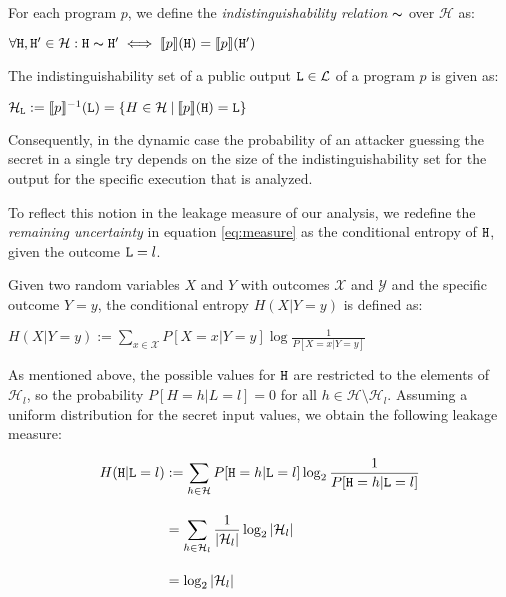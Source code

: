 \begin{definition}\label{def:ir}
        For each program $p$, we define the \emph{indistinguishability relation} $\thicksim$ over $\mathcal{H}$ as:
        \begin{center}
            $\forall \mathtt{H}, \mathtt{H}' \in \mathcal{H}: \mathtt{H} \thicksim  \mathtt{H}' \iff \llbracket p \rrbracket(\mathtt{H}) = \llbracket p \rrbracket(\mathtt{H}')$
        \end{center}
\end{definition}

\begin{definition}\label{def:is}
    The indistinguishability set of a public output $\mathtt{L} \in \mathcal{L}$ of a program $p$ is given as:
    \begin{center}
        $\mathcal{H}_{\mathtt{L}} := \llbracket p \rrbracket^{-1} (\mathtt{L}) = \{ H \in \mathcal{H} \: | \: \llbracket p \rrbracket (\mathtt{H}) = \mathtt{L} \}$
    \end{center}
\end{definition}

Consequently, in the dynamic case the probability of an attacker guessing the secret in a single try depends on the size of the indistinguishability set for the output for the specific execution that is analyzed.

To reflect this notion in the leakage measure of our analysis, we redefine the \emph{remaining uncertainty} in equation \ref{eq:measure} as the conditional entropy of $\mathtt{H}$, given the outcome $\mathtt{L} = l$.

\begin{definition}
    Given two random variables $X$ and $Y$ with outcomes $\mathcal{X}$ and $\mathcal{Y}$ and the specific outcome $Y = y$, the conditional entropy $H(X | Y = y)$ is defined as:
    \begin{center}
        $H(X | Y = y) := \sum\limits_{x \in \mathcal{X}} P[X = x | Y = y] \log \frac{1}{P[X = x | Y = y]}$
    \end{center}
\end{definition}

As mentioned above, the possible values for $\mathtt{H}$ are restricted to the elements of $\mathcal{H}_l$, so the probability $P[H = h | L = l] = 0$ for all $h \in \mathcal{H} \setminus \mathcal{H}_l$. Assuming a uniform distribution for the secret input values, we obtain the following leakage measure:

\begin{align*}
    H(\mathtt{H} | \mathtt{L} = l) &:= \sum\limits_{h \in \mathcal{H}} P[\mathtt{H} = h | \mathtt{L} = l] \log_2 \frac{1}{P[\mathtt{H} = h | \mathtt{L} = l]} \\[1em]
    &= \sum\limits_{h \in \mathcal{H}_l} \frac{1}{|\mathcal{H}_l|} \log_2 |\mathcal{H}_l| \\[1em]
    &= \log_2 |\mathcal{H}_l|
\end{align*}

